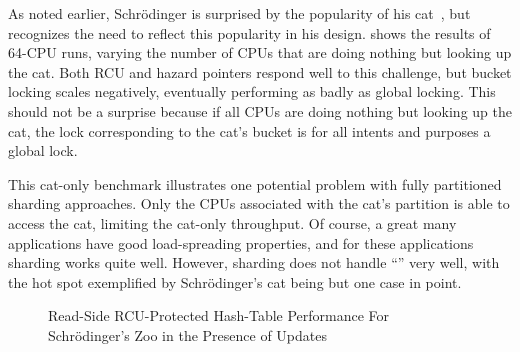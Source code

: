 As noted earlier, Schr\"odinger is surprised by the popularity of his
cat~\cite{ErwinSchroedinger1935Cat}, but recognizes the need to reflect
this popularity in his design.
shows the results of 64-CPU runs, varying the number of CPUs that are
doing nothing but looking up the cat.
Both RCU and hazard pointers respond well to this challenge, but bucket
locking scales negatively, eventually performing as badly as global
locking.
This should not be a surprise because if all CPUs are doing nothing
but looking up the cat, the lock corresponding to the cat's bucket
is for all intents and purposes a global lock.

This cat-only benchmark illustrates one potential problem with
fully partitioned sharding approaches.
Only the CPUs associated with the cat's
partition is able to access the cat, limiting the cat-only
throughput.
Of course, a great many applications have good load-spreading
properties, and for these applications sharding works
quite well.
However, sharding does not handle ``'' very well, with
the hot spot exemplified by Schr\"odinger's cat being but one case
in point.

\begin{figure}
\centering
{}
\caption{Read-Side RCU-Protected Hash-Table Performance For Schr\"odinger's Zoo in the Presence of Updates}
\label{fig:datastruct:Read-Side RCU-Protected Hash-Table Performance For Schroedinger's Zoo in the Presence of Updates}
\end{figure}

